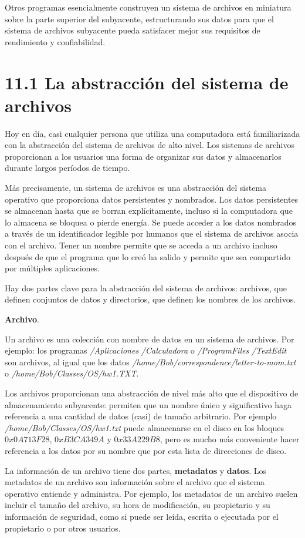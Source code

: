 \documentclass[10pt]{book}
\begin{document}
Otros programas esencialmente construyen un sistema de archivos en miniatura sobre la parte superior del subyacente, estructurando sus datos para que el sistema de archivos subyacente pueda satisfacer mejor sus requisitos de rendimiento y confiabilidad.

\section{11.1 La abstracción del sistema de archivos}
Hoy en día, casi cualquier persona que utiliza una computadora está familiarizada con la abstracción del sistema de archivos de alto nivel. Los sistemas de archivos proporcionan a los usuarios una forma de organizar sus datos y almacenarlos durante largos períodos de tiempo.

Más precisamente, un sistema de archivos es una abstracción del sistema operativo que proporciona datos persistentes y nombrados. Los datos persistentes se almacenan hasta que se borran explícitamente, incluso si la computadora que lo almacena se bloquea o pierde energía. Se puede acceder a los datos nombrados a través de un identificador legible por humanos que el sistema de archivos asocia con el archivo. Tener un nombre permite que se acceda a un archivo incluso después de que el programa que lo creó ha salido y permite que sea compartido por múltiples aplicaciones.

Hay dos partes clave para la abstracción del sistema de archivos: archivos, que definen conjuntos de datos y directorios, que definen los nombres de los archivos.

\textbf{Archivo}. 

Un archivo es una colección con nombre de datos en un sistema de archivos. Por ejemplo: los programas \textit{/Aplicaciones} \textit{/Calculadora} o \textit{/ProgramFiles} \textit{/TextEdit} son archivos, al igual que los datos \textit{/home/Bob/correspondence/letter-to-mom.txt} o \textit{/home/Bob/Classes/OS/hw1.TXT}.

Los archivos proporcionan una abstracción de nivel más alto que el dispositivo de almacenamiento subyacente: permiten que un nombre único y significativo haga referencia a una cantidad de datos (casi) de tamaño arbitrario. Por ejemplo \textit{/home/Bob/Classes/OS/hw1.txt} puede almacenarse en el disco en los bloques $0x0A713F28$, $0xB3CA349A$ y $0x33A229B8$, pero es mucho más conveniente hacer referencia a los datos por su nombre que por esta lista de direcciones de disco.

La información de un archivo tiene dos partes, \textbf{metadatos} y \textbf{datos}. Los metadatos de un archivo son información sobre el archivo que el sistema operativo entiende y administra. Por ejemplo, los metadatos de un archivo suelen incluir el tamaño del archivo, su hora de modificación, su propietario y su información de seguridad, como si puede ser leída, escrita o ejecutada por el propietario o por otros usuarios.
\end{document}
